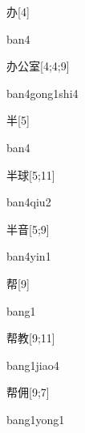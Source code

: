 \begin{verbete}[ban4]{办}[4]
\begin{pronuncia}{ban4}
\end{pronuncia}
\end{verbete}

\begin{verbete}{办公室}[4;4;9]
\begin{pronuncia}{ban4gong1shi4}
\end{pronuncia}
\end{verbete}

\begin{verbete}[ban4]{半}[5]
\begin{pronuncia}{ban4}
\end{pronuncia}
\end{verbete}

\begin{verbete}{半球}[5;11]
\begin{pronuncia}{ban4qiu2}
\end{pronuncia}
\end{verbete}

\begin{verbete}{半音}[5;9]
\begin{pronuncia}{ban4yin1}
\end{pronuncia}
\end{verbete}

\begin{verbete}[bang1]{帮}[9]
\begin{pronuncia}{bang1}
\end{pronuncia}
\end{verbete}

\begin{verbete}{帮教}[9;11]
\begin{pronuncia}{bang1jiao4}
\end{pronuncia}
\end{verbete}

\begin{verbete}{帮佣}[9;7]
\begin{pronuncia}{bang1yong1}
\end{pronuncia}
\end{verbete}


